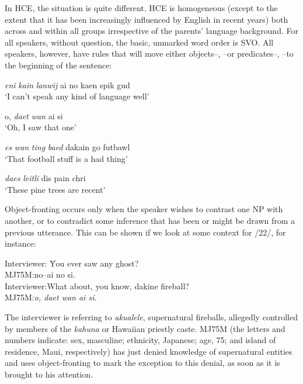 In HCE, the situation is quite different. HCE is homogeneous (except to the extent that it has been increasingly influenced by English in recent years) both across and within all groups irrespective of the parents' language background. For all speakers, without question, the basic, unmarked word order is SVO. All speakers, however, have rules that will move either objects--, --or predicates--, --to the beginning of the sentence:



\ea\label{ex:21}
 \textit{eni} \textit{kain} \textit{lanwij} ai no kaen spik gud \\
\glt  `I can't speak any kind of language well'
\z

\ea\label{ex:22}
 o, \textit{daet} \textit{wan} ai si\\
\glt  `Oh, I saw that one'
\z

\ea\label{ex:23}
 \textit{es} \textit{wan} \textit{ting} \textit{baed} dakain go futbawl \\
\glt  `That football stuff is a had thing'
\z

\ea\label{ex:24}
 \textit{daes} \textit{leitli} dis pain chri\\
\glt   `These pine trees are recent'
\z

Object-fronting occurs only when the speaker wishes to contrast one NP with another, or to contradict some inference that has been or might be drawn from a previous utterance. This can be shown if we look at some context for /22/, for instance:

\ea\label{ex:25}
\begin{tabbing}
Interviewer: \= You ever saw any ghost?\\
MJ75M:\>no--ai no si.\\
Interviewer:\>What about, you know, dakine fireball?\\
MJ75M:\>\textit{o, daet wan ai si}.
\end{tabbing}
\z
{}

\noindent The interviewer is referring to \textit{akualele}, supernatural fireballs, allegedly controlled by members of the \textit{kahuna} or Hawaiian priestly caste. MJ75M (the letters and numbers indicate: sex, masculine; ethnicity, Japanese; age, 75; and island of residence, Maui, respectively) has just denied knowledge of supernatural entities and uses object-fronting to mark the exception to this denial, as soon as it is brought to his attention.

